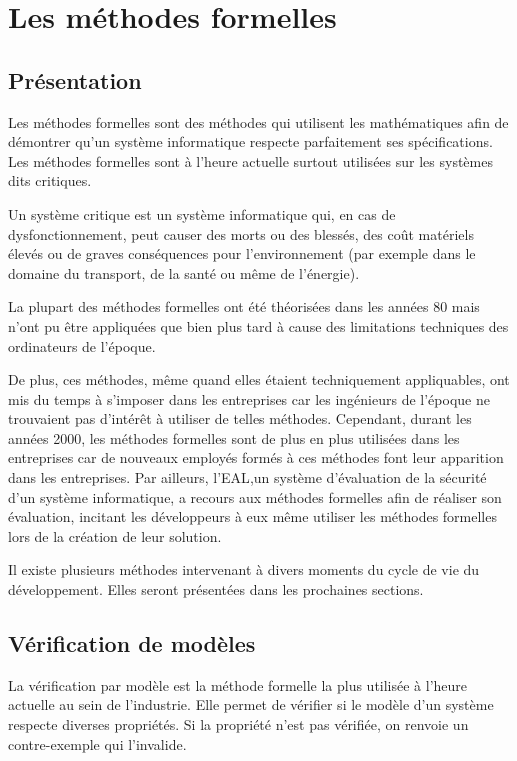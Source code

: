 \documentclass[12pt]{report}
\begin{document}
\section{Les méthodes formelles }
\subsection{Présentation}
Les méthodes formelles sont des méthodes qui utilisent les mathématiques afin de démontrer qu'un système informatique respecte parfaitement ses spécifications. Les méthodes formelles sont à l'heure actuelle surtout utilisées sur les systèmes dits critiques.

Un système critique est un système informatique qui, en cas de dysfonctionnement, peut causer des morts ou des blessés, des coût matériels élevés ou de graves conséquences pour l'environnement (par exemple dans le domaine du transport, de la santé ou même de l'énergie).

La plupart des méthodes formelles ont été théorisées dans les années 80 mais n'ont pu être appliquées que bien plus tard à cause des limitations techniques des ordinateurs de l'époque. 

De plus, ces méthodes, même quand elles étaient techniquement appliquables, ont mis du temps à s'imposer dans les entreprises car les ingénieurs de l'époque ne trouvaient pas d'intérêt à utiliser de telles méthodes. Cependant, durant les années 2000, les méthodes formelles sont de plus en plus utilisées dans les entreprises car de nouveaux employés formés à ces méthodes font leur apparition dans les entreprises. Par ailleurs, l'\gls{EAL},un système d'évaluation de la sécurité d'un système informatique, a recours aux méthodes formelles afin de réaliser son évaluation, incitant les développeurs à eux même utiliser les méthodes formelles lors de la création de leur solution\cite{griffault}.    

Il existe plusieurs méthodes intervenant à divers moments du cycle de vie du développement. Elles seront présentées dans les prochaines sections.   
\subsection{Vérification de modèles}
La vérification par modèle est la méthode formelle la plus utilisée à l'heure actuelle au sein de l'industrie\cite{griffault}. Elle permet de vérifier si le modèle d'un système respecte diverses propriétés. Si la propriété n'est pas vérifiée, on renvoie un contre-exemple qui l'invalide. 
\end{document}

